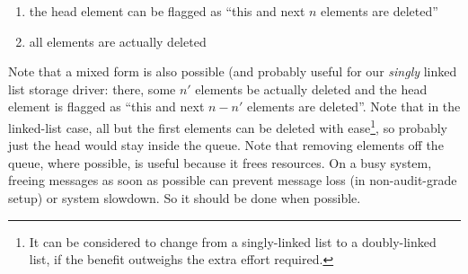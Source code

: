 \documentclass[a4paper,10pt]{article}
\begin{document}
\begin{enumerate}
\item the head element can be flagged as ``this and next $n$ elements are deleted''
\item all elements are actually deleted
\end{enumerate}

Note that a mixed form is also possible (and probably useful for our \emph{singly} linked list storage driver: there, some $n'$ elements be actually deleted and the head element is flagged as ``this and next $n - n'$ elements are deleted''. Note that in the linked-list case, all but the first elements can be deleted with ease\footnote{It can be considered to change from a singly-linked list to a doubly-linked list, if the benefit outweighs the extra effort required.}, so probably just the head would stay inside the queue. Note that removing elements off the queue, where possible, is useful because it frees resources. On a busy system, freeing messages as soon as possible can prevent message loss (in non-audit-grade setup) or system slowdown. So it should be done when possible.
\end{document}
